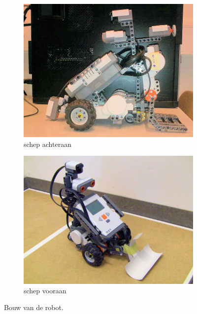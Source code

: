 \documentclass[tt1]{penoverslag}
\begin{document}
\begin{figure}
\centering
	\begin{subfigure}[h]{0.45\textwidth}
	\centering
		\includegraphics[width=\textwidth]{robotSchepOud}
		\caption{schep achteraan}
		\label{fig:robotBouwAchter}
	\end{subfigure}%
	\begin{subfigure}[h]{0.47\textwidth}
		\centering
		\includegraphics[width=\textwidth]{robotSchepNieuw}
	\caption{schep vooraan}
	\label{fig:robotBouwVoor}
\end{subfigure}
\caption{Bouw van de robot.}
\label{fig:robotBouw}
\end{figure}
\end{document}
